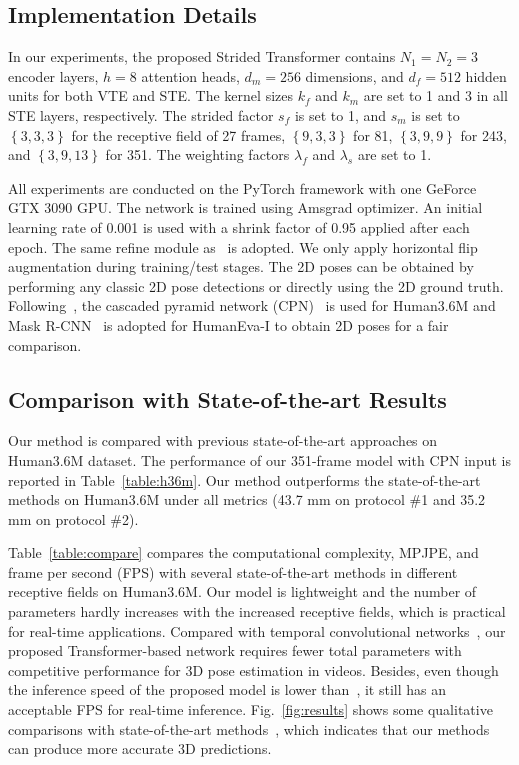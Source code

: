 \documentclass[journal]{IEEEtran}
\begin{document}
\subsection{Implementation Details}
In our experiments, the proposed Strided Transformer contains $N_{1}=N_{2}=3$ encoder layers, $h=8$ attention heads, $d_m=256$ dimensions, and $d_f=512$ hidden units for both VTE and STE. 
The kernel sizes $k_{f}$ and $k_{m}$ are set to 1 and 3 in all STE layers, respectively. 
The strided factor $s_f$ is set to 1, and $s_m$ is set to $\left\{3, 3, 3 \right\}$ for the receptive field of 27 frames, $\left\{9, 3, 3\right\}$ for 81, $\left\{3, 9, 9\right\}$ for 243, and $\left\{3, 9, 13\right\}$ for 351. 
The weighting factors $\lambda_{f}$ and $\lambda_{s}$ are set to 1. 

All experiments are conducted on the PyTorch framework with one GeForce GTX 3090 GPU.
The network is trained using Amsgrad optimizer. 
An initial learning rate of 0.001 is used with a shrink factor of 0.95  applied after each epoch. 
The same refine module as~\cite{cai2019exploiting,wang2020motion} is adopted. 
We only apply horizontal flip augmentation during training/test stages. 
The 2D poses can be obtained by performing any classic 2D pose detections or directly using the 2D ground truth. 
Following~\cite{pavllo20193d,cheng2019occlusion}, the cascaded pyramid network (CPN)~\cite{chen2018cascaded} is used for Human3.6M and Mask R-CNN~\cite{he2017mask} is adopted for HumanEva-I to obtain 2D poses for a fair comparison.

\subsection{Comparison with State-of-the-art Results}
Our method is compared with previous state-of-the-art approaches on Human3.6M dataset. 
The performance of our 351-frame model with CPN input is reported in Table~\ref{table:h36m}. 
Our method outperforms the state-of-the-art methods on Human3.6M under all metrics (43.7 mm on protocol \#1 and 35.2 mm on protocol \#2). 

Table~\ref{table:compare} compares the computational complexity, MPJPE, and frame per second (FPS) with several state-of-the-art methods in different receptive fields on Human3.6M. 
Our model is lightweight and the number of parameters hardly increases with the increased receptive fields, which is practical for real-time applications. 
Compared with temporal convolutional networks~\cite{pavllo20193d,chen2021anatomy}, our proposed Transformer-based network requires fewer total parameters with competitive performance for 3D pose estimation in videos. 
Besides, even though the inference speed of the proposed model is lower than~\cite{pavllo20193d,chen2021anatomy}, it still has an acceptable FPS for real-time inference. 
Fig.~\ref{fig:results} shows some qualitative comparisons with state-of-the-art methods~\cite{pavllo20193d,liu2020attention}, which indicates that our methods can produce more accurate 3D predictions. 
\end{document}
